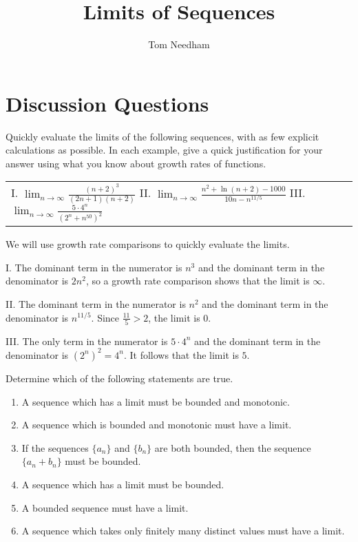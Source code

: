 \documentclass[]{ximera}
\author{Tom Needham}
\title[]{Limits of Sequences}
\begin{document}
\begin{abstract}
\end{abstract}
\maketitle

\vspace{-0.4in}

\section{Discussion Questions}

\begin{problem}
Quickly evaluate the limits of the following sequences, with as few explicit calculations as possible. In each example, give a quick justification for your answer using what you know about growth rates of functions.
\begin{center}
\begin{tabular}{lll}
I. $\lim_{n \rightarrow \infty} \frac{(n+2)^3}{(2n+1)(n+2)}$ \hspace{.1in} II. $\lim_{n \rightarrow \infty} \frac{n^2 + \ln(n+2)-1000}{10n - n^{11/5}}$ \hspace{.1in} III. $\lim_{n\rightarrow \infty} \frac{5 \cdot 4^n}{(2^n + n^{50})^2}$
\end{tabular}
\end{center}
\end{problem}

\begin{freeResponse}
We will use growth rate comparisons to quickly evaluate the limits.

I. The dominant term in the numerator is $n^3$ and the dominant term in the denominator is $2n^2$, so a growth rate comparison shows that the limit is $\infty$.

II. The dominant term in the numerator is $n^2$ and the dominant term in the denominator is $n^{11/5}$. Since $\frac{11}{5} > 2$, the limit is $0$. 

III. The only term in the numerator is $5 \cdot 4^n$ and the dominant term in the denominator is $(2^n)^2 = 4^n$. It follows that the limit is $5$. 
\end{freeResponse}

\begin{problem}
Determine which of the following statements are true.
\begin{enumerate}[label=(\alph*)]
\item A sequence which has a limit must be bounded and monotonic.
\item A sequence which is bounded and monotonic must have a limit.
\item If the sequences $\{a_n\}$ and $\{b_n\}$ are both bounded, then the sequence $\{a_n + b_n\}$ must be bounded.
\item A sequence which has a limit must be bounded.
\item A bounded sequence must have a limit.
\item A sequence which takes only finitely many distinct values must have a limit.
\end{enumerate}
\end{problem}
\end{document}
